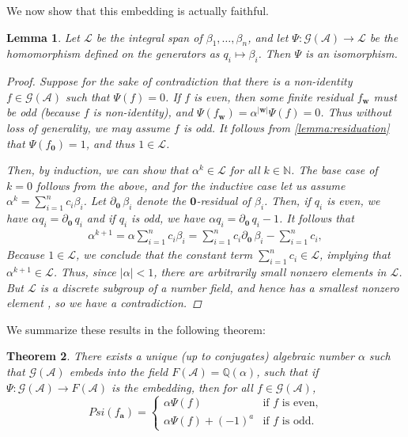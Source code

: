\documentclass[12pt, letterpaper]{article}
\newcommand{\N}{\mathbb N}
\newcommand{\Q}{\mathbb Q}
\newcommand{\A}{\mathcal A}
\newcommand{\ch}[1]{\mathbf{#1}}
\newcommand{\res}[2]{{{#1}_{\ch{#2}}}}
\newcommand{\gp}{\mathcal G}
\newtheorem{thm}{Theorem}[section]
\newtheorem{lemma}[thm]{Lemma}
\begin{document}
We now show that this embedding is actually faithful.

\begin{lemma}\label{lemma:solution_faithful}
    Let $\mathcal L$ be the integral span of $\beta_1, \ldots, \beta_n$, and
    let $\Psi: \gp(\A) \rightarrow \mathcal L$ be the homomorphism defined on
    the generators as $q_i \mapsto \beta_i$. Then $\Psi$ is an isomorphism.
    \begin{proof}
        Suppose for the sake of contradiction that there is a non-identity $f
        \in \gp(\A)$ such that $\Psi(f) = 0$. If $f$ is even, then some finite
        residual $\res{f}{w}$ must be odd (because $f$ is non-identity), and
        $\Psi(\res{f}{w}) = \alpha^{|\ch{w}|} \Psi(f) = 0$.  Thus without loss
        of generality, we may assume $f$ is odd. It follows from
        \cref{lemma:residuation} that $\Psi(\res{f}{0}) = 1$, and thus $1 \in
        \mathcal L$.

        \newcommand{\resz}[1]{\partial_{\ch{0}}\,#1}

        Then, by induction, we can show that $\alpha^k \in \mathcal L$ for all
        $k \in \N$. The base case of $k = 0$ follows from the above, and for
        the inductive case let us assume $\alpha^k = \sum_{i = 1}^n c_i
        \beta_i$. Let $\resz{\beta_i}$ denote the $\ch{0}$-residual
        of $\beta_i$.  Then, if $q_i$ is even, we have $\alpha q_i =
        \resz{q_i}$ and if $q_i$ is odd, we have $\alpha q_i =
        \resz{q_i} - 1$. It follows that
        \begin{align*}
            \alpha^{k+1} = \alpha \sum_{i = 1}^n c_i \beta_i =
            \sum_{i = 1}^n c_i \resz{\beta_i} - \sum_{i = 1}^n c_i,
        \end{align*}
        Because $1 \in \mathcal L$, we conclude that the constant
        term $\sum_{i = 1}^n c_i \in \mathcal L$, implying that $\alpha^{k+1}
        \in \mathcal L$. Thus, since $|\alpha| < 1$, there are arbitrarily
        small nonzero elements in $\mathcal L$. But $\mathcal L$ is a discrete
        subgroup of a number field, and hence has a smallest nonzero element
        \cite{stein2012algebraic}, so we have a contradiction.
    \end{proof}
\end{lemma}

We summarize these results in the following theorem:
\begin{thm}\label{thm:field_representation_unique}
    There exists a unique (up to conjugates) algebraic number $\alpha$ such that
    $\gp(\A)$ embeds into the field $F(\A) = \Q(\alpha)$, such that if
    $\Psi: \gp(\A) \rightarrow F(\A)$ is the embedding, then for all $f \in
    \gp(\A)$,
    \[
        Psi(\res{f}{a}) = \begin{cases}
            \alpha \Psi(f) & \text{if $f$ is even,}\\
            \alpha \Psi(f) + (-1)^a & \text{if $f$ is odd.}
        \end{cases}
    \]
\end{thm}
\end{document}
